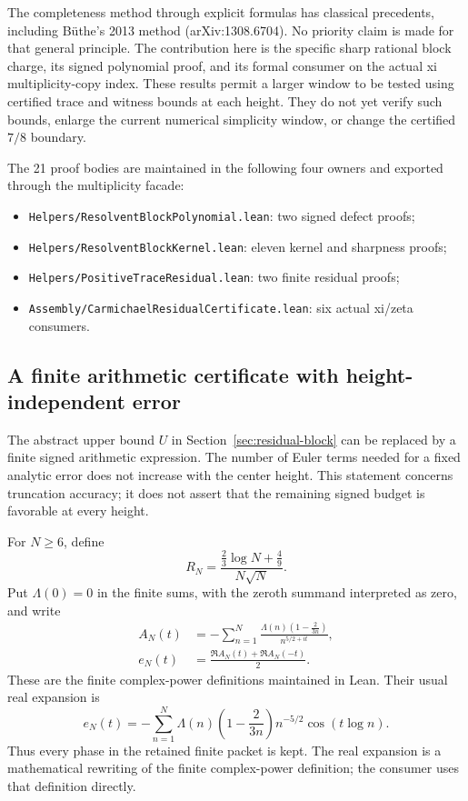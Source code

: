 The completeness method through explicit formulas has classical precedents,
including B\"uthe's 2013 method (arXiv:1308.6704).  No priority claim is made
for that general principle.  The contribution here is the specific sharp
rational block charge, its signed polynomial proof, and its formal consumer
on the actual xi multiplicity-copy index.  These results permit a larger
window to be tested using certified trace and witness bounds at each height.
They do not yet verify such bounds, enlarge the current numerical simplicity
window, or change the certified \(7/8\) boundary.

The 21 proof bodies are maintained in the following four owners and exported
through the multiplicity facade:
\begin{itemize}
\item \texttt{Helpers/ResolventBlockPolynomial.lean}: two signed defect proofs;
\item \texttt{Helpers/ResolventBlockKernel.lean}: eleven kernel and sharpness proofs;
\item \texttt{Helpers/PositiveTraceResidual.lean}: two finite residual proofs;
\item \texttt{Assembly/CarmichaelResidualCertificate.lean}: six actual xi/zeta consumers.
\end{itemize}

\subsection{A finite arithmetic certificate with height-independent error}
\label{sec:finite-euler-trace}

The abstract upper bound \(U\) in Section~\ref{sec:residual-block} can be
replaced by a finite signed arithmetic expression.  The number of Euler
terms needed for a fixed analytic error does not increase with the center
height.  This statement concerns truncation accuracy; it does not assert
that the remaining signed budget is favorable at every height.

For \(N\ge6\), define
\[
 R_N=\frac{\frac23\log N+\frac49}{N\sqrt N}.
\]
Put \(\Lambda(0)=0\) in the finite sums, with the zeroth summand interpreted
as zero, and write
\[
 \begin{aligned}
 A_N(t)&=-\sum_{n=1}^{N}
   \frac{\Lambda(n)(1-\frac{2}{3n})}{n^{5/2+it}},\\
 e_N(t)&=\frac{\Re A_N(t)+\Re A_N(-t)}2.
 \end{aligned}
\]
These are the finite complex-power definitions maintained in Lean.
Their usual real expansion is
\[
 e_N(t)=-\sum_{n=1}^{N}
  \Lambda(n)\left(1-\frac{2}{3n}\right)n^{-5/2}\cos(t\log n).
\]
Thus every phase in the retained finite packet is kept.  The real expansion
is a mathematical rewriting of the finite complex-power definition; the
consumer uses that definition directly.

